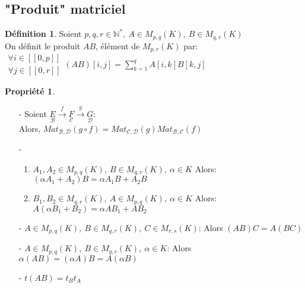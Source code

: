 \documentclass[fleqn]{article}
\theoremstyle{definition} \newtheorem*{defi}{D\'efinition}
\theoremstyle{definition} \newtheorem*{theo}{Th\'eor\`eme}
\theoremstyle{definition} \newtheorem*{coro}{Corollaire}
\theoremstyle{definition} \newtheorem*{nota}{Notation}
\theoremstyle{definition} \newtheorem*{vocab}{Vocabulaire}
\theoremstyle{remark} \newtheorem*{rqs}{Remarques}
\theoremstyle{definition} \newtheorem*{prop}{Propri\'et\'e}
\begin{document}
\subsection{"Produit" matriciel}
\begin{defi} Soient $p,q,r \in \mathbb{N}^*,\ A \in M_{p,q}(K),\ B \in M_{q,r}(K)$ \\
	On d\'efinit le produit $AB$, \'el\'ement de $M_{p,r}(K)$ par: \\
	$\left. \begin{array}{l}
		\forall i \in [\![0,p]\!] \\
		\forall j \in [\![0,r]\!]
	\end{array}\right. (AB)[i,j] = \sum_{k=1}^q A[i,k]B[k,j]$

\end{defi}

\begin{prop} $ $
	\begin{enumerate}
		\item [-] Soient $\underset{\mathscr{B}}{E} \overset{f}{\rightarrow} \underset{\mathscr{C}}{F} \overset{g}{\rightarrow}
			\underset{\mathscr{D}}{G}$: \\
			Alors, $Mat_{\mathscr{B},\mathscr{D}}(g\circ f) = Mat_{\mathscr{C},\mathscr{D}}(g) Mat_{\mathscr{B},\mathscr{C}}(f)$
		\item [-]
			\begin{enumerate}
				\item $A_1, A_2 \in M_{p,q}(K),\ B \in M_{q,r}(K),\ \alpha \in K$ Alors:\\ $(\alpha A_1 + A_2)B = \alpha A_1 B + A_2 B$
				\item $B_1, B_2 \in M_{q,r}(K),\ A \in M_{p,q}(K),\ \alpha \in K$ Alors:\\ $A(\alpha B_1 + B_2) = \alpha A B_1 + A B_2$
			\end{enumerate}
		\item [-] $A \in M_{p,q}(K),\ B \in M_{q,r}(K),\ C \in M_{r,s}(K)$: Alors $(AB)C = A(BC)$
		\item [-] $A \in M_{p,q}(K),\ B \in M_{q,r}(K),\ \alpha \in K$: Alors $\alpha (AB) = (\alpha A)B = A (\alpha B)$
		\item [-] $t(AB) = t_B t_A$
	\end{enumerate}
\end{prop}
\end{document}
